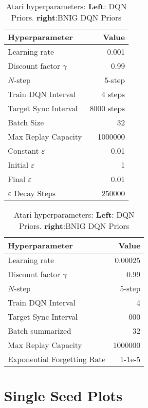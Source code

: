 {{\begin{table}[H]
    \centering
    \begin{tabular}{@{}lr@{}}
        \toprule
        Hyperparameter               & Value \\ \midrule
        Learning rate                & 0.001 \\
        Discount factor $\gamma$     & 0.99  \\
        $N$-step                     & 5-step \\
        Train DQN Interval           & 4 steps \\
        Target Sync Interval         & 8000 steps \\
        Batch Size                   & 32 \\
        Max Replay Capacity          & 1000000 \\ 
        Constant $\varepsilon$       & 0.01 \\ 
        Initial $\varepsilon$        & 1 \\
        Final $\varepsilon$          & 0.01 \\
        $\varepsilon$ Decay Steps    & 250000 \\ \bottomrule
    \end{tabular}
    \quad
    \begin{tabular}{@{}lr@{}}
        \toprule
        Hyperparameter               & Value \\ \midrule
        Learning rate                & 0.00025 \\
        Discount factor $\gamma$     & 0.99  \\
        $N$-step                     & 5-step \\
        Train DQN Interval           & 4 \\
        Target Sync Interval         & 000 \\
        Batch summarized             & 32 \\
        Max Replay Capacity          & 1000000 \\
        Exponential Forgetting Rate  & 1-1e-5 \\ \bottomrule
    \end{tabular}
    \caption{Atari hyperparameters: \textbf{Left}: DQN Priors. \textbf{right}:BNIG DQN Priors}
\end{table}

\clearpage

\section{Single Seed Plots}

}}
